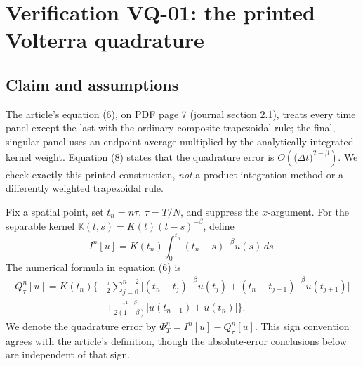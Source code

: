 \documentclass[11pt,a4paper]{amsart}
\theoremstyle{remark}
\theoremstyle{plain}
\theoremstyle{remark}
\numberwithin{equation}{section}
\begin{document}
\section{Verification VQ-01: the printed Volterra quadrature}
\label{sec:verified-vq}

\subsection{Claim and assumptions}
The article's equation (6), on PDF page 7 (journal section 2.1), treats every time panel except the last with the ordinary composite trapezoidal rule; the final, singular panel uses an endpoint average multiplied by the analytically integrated kernel weight. Equation (8) states that the quadrature error is $O(\bigl(\Delta t\bigr)^{2-\beta})$. We check exactly this printed construction, \emph{not} a product-integration method or a differently weighted trapezoidal rule.

Fix a spatial point, set $t_n=n\tau$, $\tau=T/N$, and suppress the $x$-argument. For the separable kernel $\mathbb K(t,s)=K(t)(t-s)^{-\beta}$, define
\begin{equation}\label{eq:vq-exact}
 I^n[u]=K(t_n)\int_0^{t_n}(t_n-s)^{-\beta}u(s)\,ds.
\end{equation}
The numerical formula in equation (6) is
\begin{equation}\label{eq:vq-published}
\begin{aligned}
 Q_\tau^n[u]=K(t_n)\Bigg\{&\frac\tau2\sum_{j=0}^{n-2}
 \bigl[(t_n-t_j)^{-\beta}u(t_j)
       +(t_n-t_{j+1})^{-\beta}u(t_{j+1})\bigr]\\
 &+\frac{\tau^{1-\beta}}{2(1-\beta)}
 \bigl[u(t_{n-1})+u(t_n)\bigr]\Bigg\}.
\end{aligned}
\end{equation}
We denote the quadrature error by $\Phi_T^n=I^n[u]-Q_\tau^n[u]$. This sign convention agrees with the article's definition, though the absolute-error conclusions below are independent of that sign.
\end{document}
